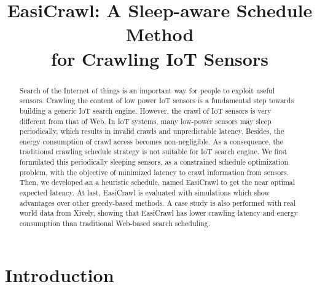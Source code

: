 \documentclass[conference]{IEEEtran}
\begin{document}
\title{EasiCrawl: A Sleep-aware Schedule Method \\for Crawling IoT Sensors}

\author{
}

\maketitle


\begin{abstract}
	
Search of the Internet of things is an important way for people to exploit useful sensors. Crawling the content of low power IoT sensors is a fundamental step towards building a generic IoT search engine.
However, the crawl of IoT sensors is very different from that of Web. In IoT systems, many low-power sensors may sleep periodically, which results in invalid crawls and unpredictable latency. Besides, the energy consumption of crawl access becomes non-negligible.
As a consequence, the traditional crawling schedule strategy is not suitable for IoT search engine.
We first formulated this periodically sleeping sensors, as a constrained schedule optimization problem, with the objective of minimized latency to crawl information from sensors. 
Then, we developed an a heuristic schedule, named EasiCrawl to get the near optimal expected latency. 
At last, EasiCrawl is evaluated with simulations which show advantages over other greedy-based methods.
A case study is also performed with real world data from Xively, showing that EasiCrawl has lower crawling latency and energy consumption than traditional Web-based search scheduling.

\end{abstract}

\IEEEpeerreviewmaketitle

\section{Introduction} \label{introduction}
\end{document}
